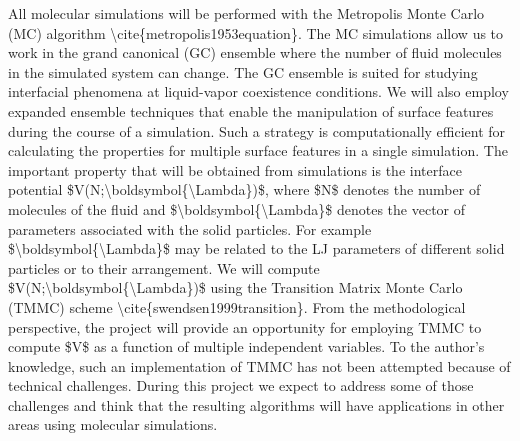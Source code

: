 \par All molecular simulations will be performed with the Metropolis Monte Carlo (MC) algorithm \textbackslash cite\{metropolis1953equation\}. The MC simulations allow us to work in the grand canonical (GC) ensemble where the number of fluid molecules in the simulated system can change. The GC ensemble is suited for studying interfacial phenomena at liquid-vapor coexistence conditions. We will also employ expanded ensemble techniques that  enable the manipulation of surface features during the course of a simulation. Such a strategy is computationally efficient for calculating the properties for multiple surface features in a single simulation. The important property that will be obtained from simulations is the interface potential \$V(N;\textbackslash boldsymbol\{\textbackslash Lambda\})\$, where \$N\$ denotes the number of molecules of the fluid and \$\textbackslash boldsymbol\{\textbackslash Lambda\}\$ denotes the vector of parameters associated with the solid particles. For example \$\textbackslash boldsymbol\{\textbackslash Lambda\}\$ may be related to the LJ parameters of different solid particles or to their arrangement. We will compute \$V(N;\textbackslash boldsymbol\{\textbackslash Lambda\})\$ using the Transition Matrix Monte Carlo (TMMC) scheme \textbackslash cite\{swendsen1999transition\}. From the methodological perspective, the project will provide an opportunity for employing TMMC to compute \$V\$ as a function of multiple independent variables. To the author's knowledge, such an implementation of TMMC has not been attempted because of technical challenges. During this project we expect to address some of those challenges and think that the resulting algorithms will have applications in other areas using molecular simulations.
